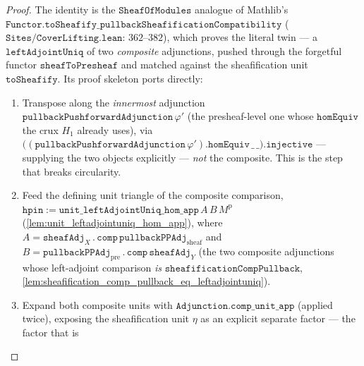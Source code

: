 \begin{proof}
  The identity is the \(\mathtt{SheafOfModules}\) analogue of Mathlib's
  \(\mathtt{Functor.toSheafify\_pullbackSheafificationCompatibility}\)
  (\(\mathtt{Sites/CoverLifting.lean}\): \(362\)--\(382\)), which proves the literal twin --- a
  \(\mathtt{leftAdjointUniq}\) of two \emph{composite} adjunctions, pushed through the forgetful functor
  \(\mathtt{sheafToPresheaf}\) and matched against the sheafification unit \(\mathtt{toSheafify}\). Its
  proof skeleton ports directly:
  \begin{enumerate}
    \item Transpose along the \emph{innermost} adjunction
      \(\mathtt{pullbackPushforwardAdjunction}\,\varphi'\) (the presheaf-level one whose
      \(\mathtt{homEquiv}\) the crux \(H_1\) already uses), via
      \(\bigl((\mathtt{pullbackPushforwardAdjunction}\,\varphi').\mathtt{homEquiv}\,\_\,\_\bigr).\mathtt{injective}\)
      --- supplying the two objects explicitly --- \emph{not} the composite. This is the step that
      breaks circularity.
    \item Feed the defining unit triangle of the composite comparison,
      \(\mathtt{hpin} := \mathtt{unit\_leftAdjointUniq\_hom\_app}\,A\,B\,M^{\mathrm p}\)
      (\cref{lem:unit_leftadjointuniq_hom_app}), where
      \(A = \mathtt{sheafAdj}_X \mathbin{.}\!\mathtt{comp}\,\mathtt{pullbackPPAdj}_{\mathrm{sheaf}}\) and
      \(B = \mathtt{pullbackPPAdj}_{\mathrm{pre}} \mathbin{.}\!\mathtt{comp}\,\mathtt{sheafAdj}_Y\)
      (the two composite adjunctions whose left-adjoint comparison \emph{is}
      \(\mathtt{sheafificationCompPullback}\), \cref{lem:sheafification_comp_pullback_eq_leftadjointuniq}).
    \item Expand both composite units with \(\mathtt{Adjunction.comp\_unit\_app}\) (applied twice),
      exposing the sheafification unit \(\eta\) as an explicit separate factor --- the factor that is

\end{enumerate}
\end{proof}
